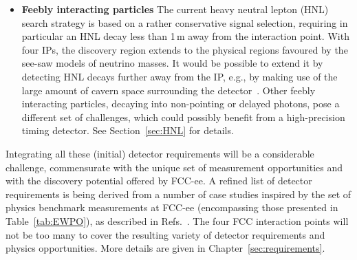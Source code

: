 \begin{itemize}
\item {\bf Feebly interacting particles} 
The current heavy neutral lepton (HNL) search strategy is based on a rather conservative signal selection, requiring in particular an HNL decay less than 1\,m away from the interaction point. 
With four IPs, the discovery region extends to the physical regions favoured by the see-saw models of neutrino masses.
It would be possible to extend it by detecting HNL decays further away from the IP, e.g., by making use of the large amount of cavern space surrounding the detector~\cite{Chrzaszcz:2020emg}. 
Other feebly interacting particles, decaying into non-pointing or delayed photons, pose a different set of challenges, which could possibly benefit from a high-precision timing detector. 
See Section~\ref{sec:HNL} for details. 
\end{itemize}

Integrating all these (initial) detector requirements will be a considerable challenge, commensurate with the unique set of measurement opportunities and with the discovery potential offered by FCC-ee.  
A refined list of detector requirements is being derived from a number of case studies inspired by the set of physics benchmark measurements at FCC-ee (encompassing those presented in Table~\ref{tab:EWPO}), as described in Refs.~\cite{SnowmassBenchmarkProcesses,Azzi:2021ylt}. 
The four FCC interaction points will not be too many to cover the resulting variety of detector requirements and physics opportunities. 
More details are given in Chapter~\ref{sec:requirements}.

